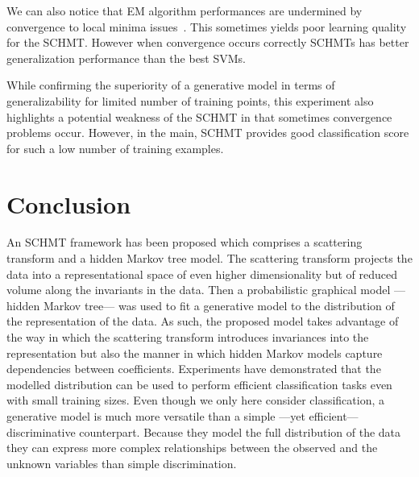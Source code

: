 \documentclass{article}
\begin{document}
		We can also notice that EM algorithm performances are undermined by convergence to local minima issues~\cite{moon1996expectation}. This sometimes yields poor learning quality for the SCHMT. However when
    convergence occurs correctly SCHMTs has better generalization performance than the best SVMs.
    
    While confirming the superiority of a generative model in terms of generalizability for limited number of training points, this experiment also highlights a
    potential weakness of the SCHMT in that sometimes convergence problems occur. However, in the main, SCHMT provides good classification score for such a low number of training examples.
		
%     

\section{Conclusion}
  \label{sec:Conclusion}
  \vspace{-5pt}
  An SCHMT framework has been proposed which comprises a scattering transform and a hidden Markov tree model.  The scattering transform projects the data into a representational space of even higher dimensionality but of reduced volume along the invariants in the data. Then a probabilistic graphical model ---hidden Markov tree--- was used to fit a generative model to the distribution of the representation of the data.  As such, the proposed model takes advantage of the way in which the scattering transform introduces invariances into the representation but also the manner in which hidden Markov models capture dependencies between coefficients.  Experiments have demonstrated that the modelled distribution can be used to perform efficient classification tasks even with small training sizes. Even though we only here consider classification, a generative model is much more versatile than a simple ---yet efficient--- discriminative counterpart. Because they model the full distribution of the data they can express more complex relationships between the observed and the unknown variables than simple discrimination. 
  
\end{document}

